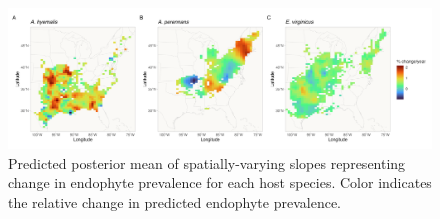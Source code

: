 \documentclass[11pt]{article}
\begin{document}
\begin{figure}[H]
	\centering
	\includegraphics[width = \linewidth]{../Plots/svc_time_map.png}
	\caption[Predicted posterior mean of spatially-varying slopes representing change in endophyte prevalence for each host species.]{Predicted posterior mean of spatially-varying slopes representing change in endophyte prevalence for each host species. Color indicates the relative change in predicted endophyte prevalence.}
	\label{fig:svc_time_map}
\end{figure}




\end{document}
